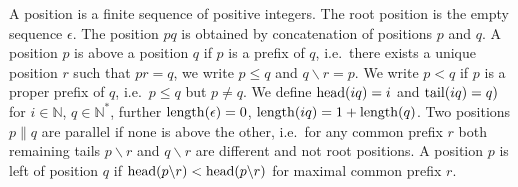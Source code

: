
\begin{definition}\label{def:position}
	A {\myem position} is a finite sequence of positive integers.
	The root position is the empty sequence $\epsilon$.
	The position $pq$ is obtained by concatenation of positions $p$ and $q$.
	A position $p$ is {\myem above} a position $q$ if $p$ is a prefix of $q$, 
	i.e.~there exists a unique position $r$ such that $pr = q$, 
	we write $p\leq q$ and $q\backslash r = p$.
	We write $p<q$ if $p$ is a proper prefix of $q$, i.e.~$p\leq q$ but $p\neq q$.
	We define $\operatorname{head}(iq)=i$ and $\operatorname{tail}(iq) = q)$ for $i\in\mathbb{N}$, $q\in\mathbb{N}^*$,
	further $\operatorname{length}(\epsilon)=0$, $\operatorname{length}(iq) = 1 + \operatorname{length}(q)$.
%	
	Two positions $p\parallel q$ are parallel if none is above the other,
	i.e.~for any common prefix $r$ both remaining tails
	$p\backslash r$ and $q\backslash r$ are different and not root positions.
	A position $p$ is left of position $q$ if $\operatorname{head}(p\backslash r) < \operatorname{head}(p\backslash r)$ 
	for maximal common prefix $r$. 
	
\end{definition}
